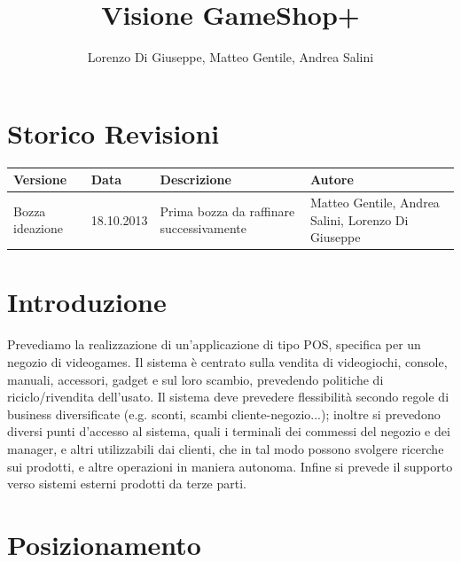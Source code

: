 \documentclass[a4paper,10pt]{report}
\title{Visione GameShop+}
\author{Lorenzo Di Giuseppe, Matteo Gentile, Andrea Salini}
\begin{document}
  \maketitle

  
  \section*{Storico Revisioni}
  \begin{center}
    \begin{tabular}{|p{} p{} p{} p{}|}
      \hline
      \textbf{Versione} & \textbf{Data} & \textbf{Descrizione} & \textbf{Autore}\\
      \hline
      Bozza ideazione & 18.10.2013 & Prima bozza da raffinare
      successivamente & Matteo Gentile, Andrea Salini, Lorenzo Di Giuseppe\\
      \hline
    \end{tabular}
  \end{center}

  
  \section*{Introduzione}
  Prevediamo la realizzazione di un'applicazione di tipo POS, specifica per un negozio di
videogames. Il sistema è centrato sulla vendita di videogiochi, console, manuali,
accessori, gadget e sul loro scambio, prevedendo politiche di riciclo/rivendita dell'usato. Il
sistema deve prevedere flessibilità secondo regole di business diversificate (e.g. sconti,
scambi cliente-negozio...); inoltre si prevedono diversi punti d'accesso al sistema, quali i
terminali dei commessi del negozio e dei manager, e altri utilizzabili dai clienti, che in tal
modo possono svolgere ricerche sui prodotti, e altre operazioni in maniera autonoma.
Infine si prevede il supporto verso sistemi esterni prodotti da terze parti.

  \section*{Posizionamento}
  
\end{document}
